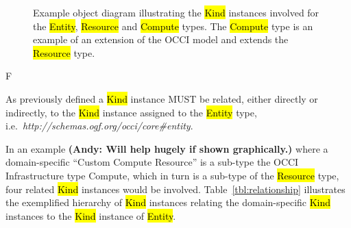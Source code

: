 \documentclass[10pt,a4paper]{article}
\begin{document}
\begin{figure}[!h]
{\centering {} \par}
  \caption{Example object diagram illustrating the \hl{Kind} instances involved
  for the \hl{Entity}, \hl{Resource} and \hl{Compute} types. The \hl{Compute}
  type is an example of an extension of the OCCI model and extends the
  \hl{Resource} type.}
  \label{fig:kind_relationships}
\end{figure}

F

As previously defined a \hl{Kind} instance MUST be related, either directly or
indirectly, to the \hl{Kind} instance assigned to the \hl{Entity} type,
i.e.~\textit{http://schemas.ogf.org/occi/core\#entity}.

In an example \textbf{(Andy: Will help hugely if shown graphically.)} where a 
domain-specific ``Custom Compute Resource'' is a sub-type
the OCCI Infrastructure type Compute, which in turn is a sub-type of the
\hl{Resource} type, four related \hl{Kind} instances would be involved.
%
Table~\ref{tbl:relationship} illustrates the exemplified hierarchy of \hl{Kind}
instances relating the domain-specific \hl{Kind} instances to the \hl{Kind}
instance of \hl{Entity}.

\end{document}
